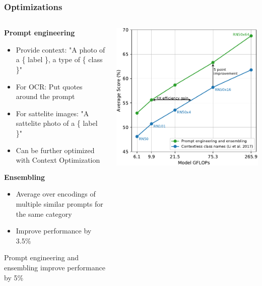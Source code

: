 \begin{frame}
    \frametitle{Optimizations}
    \scriptsize
    \begin{columns}[T]
        \begin{column}{0.65\textwidth}
            \textbf{Prompt engineering}
            \begin{itemize}
                \item Provide context: "A photo of a \{ label \}, a type of \{ class \}"
                \item For OCR: Put quotes around the prompt
                \item For sattelite images: "A sattelite photo of a \{ label \}"
                \item Can be further optimized with Context Optimization 
            \end{itemize}

            \pause
            \vspace{1em}

            \textbf{Ensembling}
            \begin{itemize}
                \item Average over encodings of multiple similar prompts for the same category
                \item Improve performance by 3.5\%
            \end{itemize}
            \vspace{1em}

            Prompt engineering and ensembling improve performance by 5\%
        \end{column}
        \pause
        \begin{column}{0.35\textwidth}
            \includegraphics[width=\textwidth]{./images/prompt-engineering}
        \end{column}
    \end{columns}
\end{frame}
